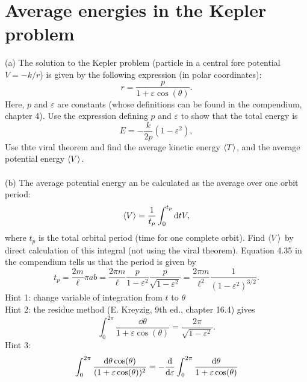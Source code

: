 \documentclass{article}
\begin{document}
    \section{Average energies in the Kepler problem}
        (a) The solution to the Kepler problem (particle in a central fore potential $V = -k/r$) is given by the following expression (in polar coordinates):
        \begin{equation*}
            r = \frac{p}{1 + \varepsilon \cos(\theta)}.
        \end{equation*}
        Here, $p$ and $\varepsilon$ are constants (whose definitions can be found in the compendium, chapter 4). Use the expression defining $p$ and $\varepsilon$ to show that the total energy is 
        \begin{equation*}
            E = - \frac{k}{2p}(1 - \varepsilon^2),
        \end{equation*}
        Use thte viral theorem and find the average kinetic energy $\expectationvalue{T}$, and the average potential energy $\expectationvalue{V}$. \\ \\
        (b) The average potential energy an be calculated as the average over one orbit period:
        \begin{equation*}
            \expval{V} = \frac{1}{t_p} \int_0^{t_p} \dd t V,
        \end{equation*}
        where $t_p$ is the total orbital period (time for one complete orbit). Find $\expval{V}$ by direct calculation of this integral (not using the viral theorem). Equation 4.35 in the compendium tells us that the period is given by
        \begin{equation*}
            t_p = \frac{2m}{\ell} \pi a b = \frac{2 \pi m}{\ell } \frac{p}{1 - \varepsilon^2} \frac{p}{\sqrt{1 - \varepsilon^2}} = \frac{2 \pi m}{\ell^2} \frac{1}{(1 - \varepsilon^2)^{3/2}}.
        \end{equation*}
        Hint 1: change variable of integration from $t$ to $\theta$\\
        Hint 2: the residue method (E. Kreyzig, 9th ed., chapter 16.4) gives
        \begin{equation*}
            \int_0^{2\pi} \frac{\dd \theta}{1 + \varepsilon \cos(\theta)} = \frac{2 \pi}{\sqrt{1 - \varepsilon^2}}.
        \end{equation*}
        Hint 3: 
        \begin{equation*}
            \int_0^{2\pi} \frac{\dd \theta \cos(\theta)}{(1 + \varepsilon \cos(\theta))^2} = - \dv{\varepsilon} \int_0^{2\pi} \frac{\dd \theta}{1 + \varepsilon \cos(\theta)}  
        \end{equation*}
\end{document}
